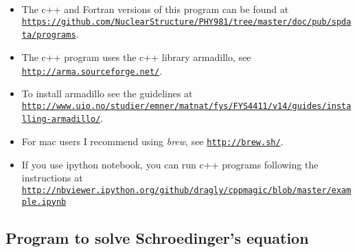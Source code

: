 \documentclass[%
twoside,                 %
final,                   %
10pt]{article}
\begin{document}
\begin{itemize}
\item The c++ and Fortran versions of this program can be found at \href{{https://github.com/NuclearStructure/PHY981/tree/master/doc/pub/spdata/programs}}{\nolinkurl{https://github.com/NuclearStructure/PHY981/tree/master/doc/pub/spdata/programs}}. 

\item The c++  program uses the c++ library armadillo, see \href{{http://arma.sourceforge.net/}}{\nolinkurl{http://arma.sourceforge.net/}}. 

\item To install armadillo see the guidelines at \href{{http://www.uio.no/studier/emner/matnat/fys/FYS4411/v14/guides/installing-armadillo/}}{\nolinkurl{http://www.uio.no/studier/emner/matnat/fys/FYS4411/v14/guides/installing-armadillo/}}. 

\item For mac users I recommend using \emph{brew}, see \href{{http://brew.sh/}}{\nolinkurl{http://brew.sh/}}.

\item If you use ipython notebook, you can run c++ programs following the instructions at \href{{http://nbviewer.ipython.org/github/dragly/cppmagic/blob/master/example.ipynb}}{\nolinkurl{http://nbviewer.ipython.org/github/dragly/cppmagic/blob/master/example.ipynb}}
\end{itemize}

\noindent




\subsection*{Program to solve Schroedinger's equation}

\end{document}
